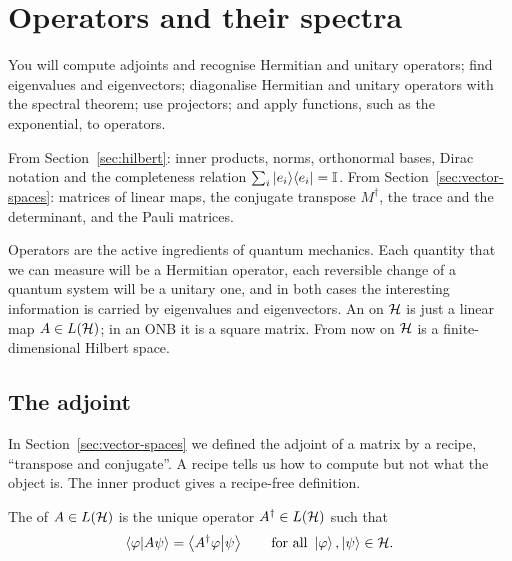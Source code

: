 \section{Operators and their spectra}\label{sec:operators}

\begin{objectives}
  You will compute adjoints and recognise Hermitian and unitary operators; find eigenvalues and eigenvectors; diagonalise Hermitian and unitary operators with the spectral theorem; use projectors; and apply functions, such as the exponential, to operators.
\end{objectives}

\begin{recall}
  From Section~\ref{sec:hilbert}: inner products, norms, orthonormal bases, Dirac notation and the completeness relation $\sum_i\left|e_i\right\rangle\!\left\langle e_i\right|=\mathbb{I}$. From Section~\ref{sec:vector-spaces}: matrices of linear maps, the conjugate transpose $M^\dagger$, the trace and the determinant, and the Pauli matrices.
\end{recall}

Operators are the active ingredients of quantum mechanics. Each quantity that we can measure will be a Hermitian operator, each reversible change of a quantum system will be a unitary one, and in both cases the interesting information is carried by eigenvalues and eigenvectors. An  on $\mathcal{H}$ is just a linear map $A\in L(\mathcal{H})$; in an ONB it is a square matrix. From now on $\mathcal{H}$ is a finite-dimensional Hilbert space.

\subsection{The adjoint}

In Section~\ref{sec:vector-spaces} we defined the adjoint of a matrix by a recipe, ``transpose and conjugate''. A recipe tells us how to compute but not what the object is. The inner product gives a recipe-free definition.

\begin{definition}[Adjoint]\label{def:adjoint}
  The  of $A\in L(\mathcal{H})$ is the unique operator $A^\dagger\in L(\mathcal{H})$ such that
  \[
    \left\langle\varphi\middle|A\psi\right\rangle=\left\langle A^\dagger\varphi\middle|\psi\right\rangle\qquad\text{for all }\left|\varphi\right\rangle,\left|\psi\right\rangle\in\mathcal{H} .
  \]
\end{definition}

